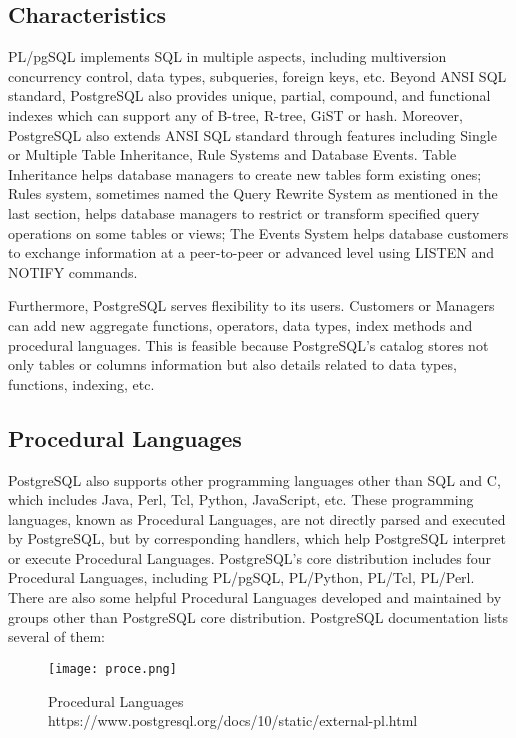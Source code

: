 \documentclass[a4paper]{article}
\begin{document}
\subsection{Characteristics}
PL/pgSQL implements SQL in multiple aspects, including multiversion concurrency control, data types, subqueries, foreign keys, etc. Beyond ANSI SQL standard, PostgreSQL also provides unique, partial, compound, and functional indexes which can support any of B-tree, R-tree, GiST or hash.\cite{1} Moreover, PostgreSQL also extends ANSI SQL standard through features including Single or Multiple Table Inheritance, Rule Systems and Database Events. Table Inheritance helps database managers to create new tables form existing ones; Rules system, sometimes named the Query Rewrite System as mentioned in the last section, helps database managers to restrict or transform specified query operations on some tables or views; The Events System helps database customers to exchange information at a peer-to-peer or advanced level using LISTEN and NOTIFY commands.\cite{1}

Furthermore, PostgreSQL serves flexibility to its users. Customers or Managers can add new aggregate functions, operators, data types, index methods and procedural languages. This is feasible because PostgreSQL's catalog stores not only tables or columns information but also details related to data types, functions, indexing, etc.\cite{1}

\subsection{Procedural Languages}
PostgreSQL also supports other programming languages other than SQL and C, which includes Java, Perl, Tcl, Python, JavaScript, etc.\cite{1} These programming languages, known as Procedural Languages, are not directly parsed and executed by PostgreSQL, but by corresponding handlers, which help PostgreSQL interpret or execute Procedural Languages. PostgreSQL's core distribution includes four Procedural Languages, including PL/pgSQL, PL/Python, PL/Tcl, PL/Perl. \cite{1} There are also some helpful Procedural Languages developed and maintained by groups other than PostgreSQL core distribution. PostgreSQL documentation lists several of them:
\begin{figure}[H]
\centering
\texttt{[image: proce.png]}
\caption{Procedural Languages\\https://www.postgresql.org/docs/10/static/external-pl.html }
\end{figure}
\end{document}
